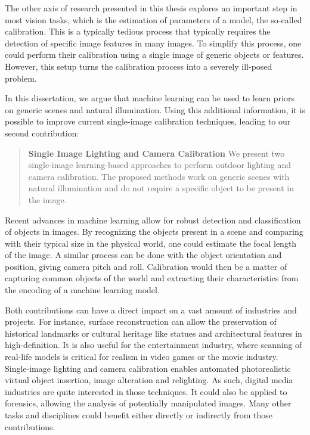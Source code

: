 The other axis of research presented in this thesis explores an important step in most vision tasks, which is the estimation of parameters of a model, the so-called calibration. This is a typically tedious process that typically requires the detection of specific image features in many images. To simplify this process, one could perform their calibration using a single image of generic objects or features. However, this setup turns the calibration process into a severely ill-posed problem.

In this dissertation, we argue that machine learning can be used to learn priors on generic scenes and natural illumination. Using this additional information, it is possible to improve current single-image calibration techniques, leading to our second contribution:
%
\begin{quotation}
\textbf{Single Image Lighting and Camera Calibration} We present two single-image learning-based approaches to perform outdoor lighting and camera calibration. The proposed methods work on generic scenes with natural illumination and do not require a specific object to be present in the image.
\end{quotation}

Recent advances in machine learning allow for robust detection and classification of objects in images. By recognizing the objects present in a scene and comparing with their typical size in the physical world, one could estimate the focal length of the image. A similar process can be done with the object orientation and position, giving camera pitch and roll. Calibration would then be a matter of capturing common objects of the world and extracting their characteristics from the encoding of a machine learning model.

Both contributions can have a direct impact on a vast amount of industries and projects. For instance, surface reconstruction can allow the preservation of historical landmarks or cultural heritage like statues and architectural features in high-definition. It is also useful for the entertainment industry, where scanning of real-life models is critical for realism in video games or the movie industry. Single-image lighting and camera calibration enables automated photorealistic virtual object insertion, image alteration and relighting. As such, digital media industries are quite interested in those techniques. It could also be applied to forensics, allowing the analysis of potentially manipulated images. Many other tasks and disciplines could benefit either directly or indirectly from those contributions.

